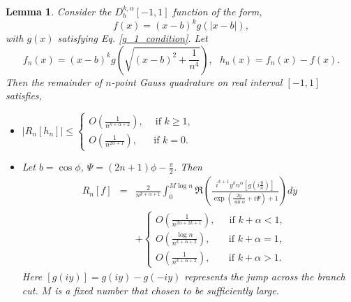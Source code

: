 \documentclass[11pt]{article}
\newtheorem{lemma}{Lemma}
\begin{document}
\begin{lemma} \label{lemma_g1}
    Consider the $D_b^{k,\alpha}[-1,1]$ function of the form, 
    \begin{equation}
        f(x) = (x-b)^k g(|x-b|),
    \end{equation}
    with $g(x)$ satisfying Eq. \eqref{g_1_condition}. Let
    \begin{equation}
        f_n(x) = (x-b)^k g(\sqrt{(x-b)^2+\frac{1}{n^4}}), \ \ \ h_n(x) = f_n(x) - f(x).
    \end{equation}
    Then the remainder of $n$-point Gauss quadrature on real interval $[-1,1]$  satisfies,
    \begin{itemize}
        \item[(I)] 
        $\displaystyle |R_n[h_n]| \leq  \begin{cases}
        \displaystyle O(\frac{1}{n^{k+\alpha+2}}), \ \ \ \ \text{ if } k \geq 1,\\
        \displaystyle O(\frac{1}{n^{2\alpha+1}}), \ \ \ \ \ \ \text{ if } k=0.
    \end{cases}$
    \item[(II)] Let $b=\cos\phi$, $\Psi =(2n+1)\phi-\frac{\pi}{2}$. Then 
    \begin{eqnarray}
        R_n[f] &=& \frac{2}{ n^{k+\alpha+1}}\int_{0}^{M\log n}  \Re\left(\frac{ i^{k+1}y^{k} n^{\alpha} \left[ g(i\frac{y}{n})\right] }{\exp\left(\frac{2y}{\sin\phi}+i\Psi\right) + 1}\right) dy \nonumber\\
        &&+\begin{cases}
        O(\frac{1}{n^{2\alpha+2k+1}}), \ \ \ \ \  \text{ if } k+\alpha <1,\\
        O(\frac{\log n}{n^{k+\alpha+2}}), \ \ \ \ \ \ \ \text{ if } k+\alpha =1,\\
        O(\frac{1}{n^{k+\alpha+2}}),\ \ \ \ \ \ \  \text{ if }  k+\alpha >1.
    \end{cases}
    \end{eqnarray}
    Here $\left[g(iy)\right] = g(iy)-g(-iy)$ represents the jump across the branch cut. $M$ is a fixed number that chosen to be sufficiently large.
    \end{itemize}
\end{lemma} 
\end{document}
